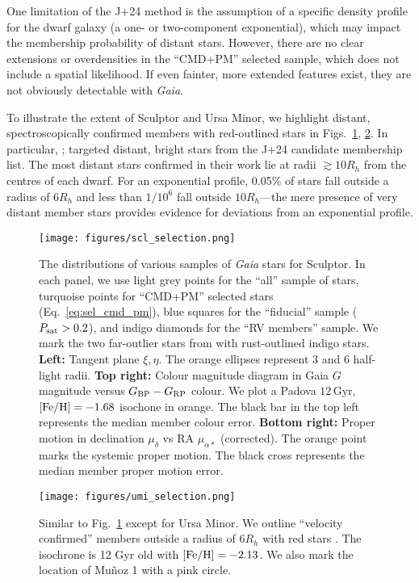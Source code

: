 One limitation of the J+24 method is the assumption of a specific
density profile for the dwarf galaxy (a one- or two-component
exponential), which may impact the membership probability of distant
stars. However, there are no clear extensions or overdensities in the
``CMD+PM'' selected sample, which does not include a spatial likelihood.
If even fainter, more extended features exist, they are not obviously
detectable with \emph{Gaia}.

To illustrate the extent of Sculptor and Ursa Minor, we highlight
distant, spectroscopically confirmed members with red-outlined stars in
Figs.~\ref{fig:scl_selection}, \ref{fig:umi_selection}. In particular,
\citet{sestito+2023a}; \citet{sestito+2023b} targeted distant, bright
stars from the J+24 candidate membership list. The most distant stars
confirmed in their work lie at radii \(\gtrsim 10 R_h\) from the centres
of each dwarf. For an exponential profile, 0.05\% of stars fall outside
a radius of \(6R_h\) and less than \(1/10^6\) fall outside
\(10R_h\)---the mere presence of very distant member stars provides
evidence for deviations from an exponential profile.

\begin{figure}
\centering
\texttt{[image: figures/scl\_selection.png]}
\caption[Sculptor sample selection]{The distributions of various samples
of \emph{Gaia} stars for Sculptor. In each panel, we use light grey
points for the ``all'' sample of stars, turquoise points for ``CMD+PM''
selected stars (Eq.~\ref{eq:sel_cmd_pm}), blue squares for the
``fiducial'' sample (\(P_{\rm sat} > 0.2\)), and indigo diamonds for the
``RV members'' sample. We mark the two far-outlier stars from
\citet{sestito+2023a} with rust-outlined indigo stars. \textbf{Left:}
Tangent plane \(\xi, \eta\). The orange ellipses represent 3 and 6
half-light radii. \textbf{Top right:} Colour magnitude diagram in Gaia
\(G\) magnitude versus \(G_{\rm BP} - G_{\rm RP}\) colour. We plot a
Padova \(12\,\)Gyr, \({\rm [Fe/H] }=-1.68\) isochone in orange. The
black bar in the top left represents the median member colour error.
\textbf{Bottom right:} Proper motion in declination \(\mu_\delta\) vs RA
\(\mu_{\alpha*}\) (corrected). The orange point marks the systemic
\citet{MV2020b} proper motion. The black cross represents the median
member proper motion error.}\label{fig:scl_selection}
\end{figure}

\begin{figure}
\centering
\texttt{[image: figures/umi\_selection.png]}
\caption[Ursa Minor sample selection]{Similar to
Fig.~\ref{fig:scl_selection} except for Ursa Minor. We outline
``velocity confirmed'' members outside a radius of \(6R_h\) with red
stars \citep[from][]{sestito+2023b, pace+2020, spencer+2018}. The
isochrone is 12 Gyr old with \({\rm [Fe/H]} = -2.13\). We also mark the
location of Muñoz 1 with a pink circle.}\label{fig:umi_selection}
\end{figure}

